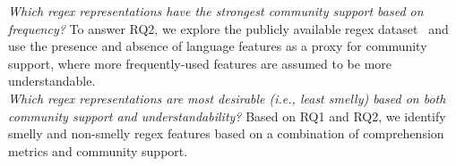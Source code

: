  {\em Which regex representations have the strongest {community support} based on frequency?} %
To answer RQ2, we explore the publicly available regex dataset~\cite{chapman2016} and use the presence and absence of language features as a proxy for community support, where more frequently-used features are assumed to be more understandable.\\

 {\em Which regex representations are most desirable (i.e., least smelly) based on both community support and understandability?}
Based on RQ1 and RQ2, we identify smelly and non-smelly regex features based on a combination of comprehension metrics and community support. \\




%
%
%
%
%
%
%




